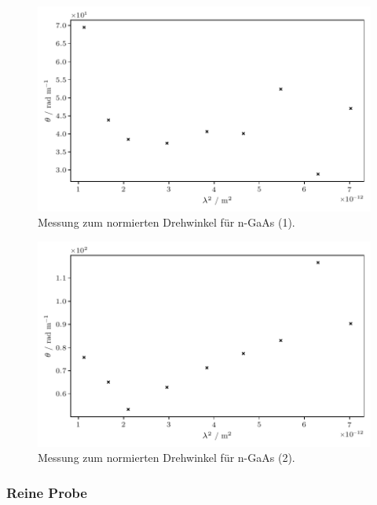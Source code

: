 \begin{figure}[H]
    \centering
    \includegraphics{build/doped-1.pdf}
    \caption{Messung zum normierten Drehwinkel für n-GaAs (1).}
    \label{fig:dotiert-1}
\end{figure}

\begin{figure}[H]
    \centering
    \includegraphics{build/doped-2.pdf}
    \caption{Messung zum normierten Drehwinkel für n-GaAs (2).}
    \label{fig:dotiert-2}
\end{figure}

\subsubsection{Reine Probe}

